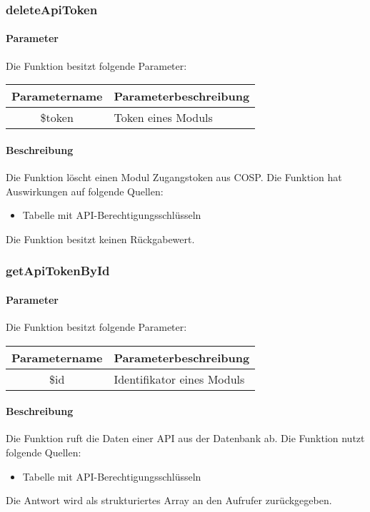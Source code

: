 \subsubsection{deleteApiToken}
\paragraph{Parameter} Die Funktion besitzt folgende Parameter:
\begin{table}[H]
	\begin{tabular}{|c|p{11cm}|}
		\hline
		\textbf{Parametername} & \textbf{Parameterbeschreibung} \\ \hline
		\$token & Token eines Moduls \\ \hline
	\end{tabular}
\end{table}
\paragraph{Beschreibung} Die Funktion löscht einen Modul Zugangstoken aus {\glqq COSP\grqq}. Die Funktion hat Auswirkungen auf folgende Quellen:
\begin{itemize}
	\item Tabelle mit API-Berechtigungsschlüsseln
\end{itemize}
Die Funktion besitzt keinen Rückgabewert.
\subsubsection{getApiTokenById}
\paragraph{Parameter} Die Funktion besitzt folgende Parameter:
\begin{table}[H]
	\begin{tabular}{|c|p{11cm}|}
		\hline
		\textbf{Parametername} & \textbf{Parameterbeschreibung} \\ \hline
		\$id & Identifikator eines Moduls \\ \hline
	\end{tabular}
\end{table}
\paragraph{Beschreibung} Die Funktion ruft die Daten einer API aus der Datenbank ab. Die Funktion nutzt folgende Quellen:
\begin{itemize}
	\item Tabelle mit API-Berechtigungsschlüsseln
\end{itemize}
Die Antwort wird als strukturiertes Array an den Aufrufer zurückgegeben.
